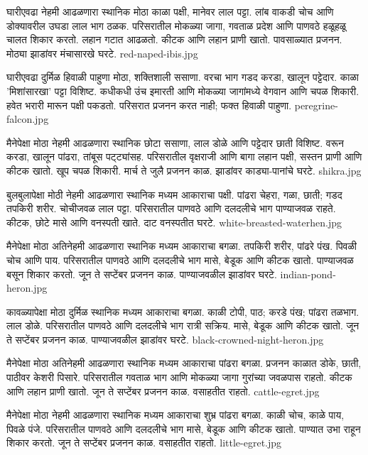 \documentclass[aspectratio=169]{beamer}
\begin{document}
{घारीएवढा}
{नेहमी आढळणारा स्थानिक}
{मोठा काळा पक्षी, मानेवर लाल पट्टा. लांब वाकडी चोच आणि डोक्यावरील उघडा लाल भाग ठळक.}
{परिसरातील मोकळ्या जागा, गवताळ प्रदेश आणि पाणवठे}
{हळूहळू चालत शिकार करतो. लहान गटात आढळतो. कीटक आणि लहान प्राणी खातो.}
{पावसाळ्यात प्रजनन. मोठ्या झाडांवर मंचासारखे घरटे.}
{red-naped-ibis.jpg}

{घारीएवढा}
{दुर्मिळ हिवाळी पाहुणा}
{मोठा, शक्तिशाली ससाणा. वरचा भाग गडद करडा, खालून पट्टेदार. काळा 'मिशांसारखा' पट्टा विशिष्ट.}
{कधीकधी उंच इमारती आणि मोकळ्या जागांमध्ये}
{वेगवान आणि चपळ शिकारी. हवेत भरारी मारून पक्षी पकडतो.}
{परिसरात प्रजनन करत नाही; फक्त हिवाळी पाहुणा.}
{peregrine-falcon.jpg}

{मैनेपेक्षा मोठा}
{नेहमी आढळणारा स्थानिक}
{छोटा ससाणा, लाल डोळे आणि पट्टेदार छाती विशिष्ट. वरून करडा, खालून पांढरा, तांबूस पट्ट्यांसह.}
{परिसरातील वृक्षराजी आणि बागा}
{लहान पक्षी, सस्तन प्राणी आणि कीटक खातो. खूप चपळ शिकारी.}
{मार्च ते जुलै प्रजनन काळ. झाडांवर काड्या-पानांचे घरटे.}
{shikra.jpg}

{बुलबुलापेक्षा मोठी}
{नेहमी आढळणारा स्थानिक}
{मध्यम आकाराचा पक्षी. पांढरा चेहरा, गळा, छाती; गडद तपकिरी शरीर. चोचीजवळ लाल पट्टा.}
{परिसरातील पाणवठे आणि दलदलीचे भाग}
{पाण्याजवळ राहते. कीटक, छोटे मासे आणि वनस्पती खाते.}
{दाट वनस्पतीत घरटे.}
{white-breasted-waterhen.jpg}

{मैनेपेक्षा मोठा}
{अतिनेहमी आढळणारा स्थानिक}
{मध्यम आकाराचा बगळा. तपकिरी शरीर, पांढरे पंख. पिवळी चोच आणि पाय.}
{परिसरातील पाणवठे आणि दलदलीचे भाग}
{मासे, बेडूक आणि कीटक खातो. पाण्याजवळ बसून शिकार करतो.}
{जून ते सप्टेंबर प्रजनन काळ. पाण्याजवळील झाडांवर घरटे.}
{indian-pond-heron.jpg}

{कावळ्यापेक्षा मोठा}
{दुर्मिळ स्थानिक}
{मध्यम आकाराचा बगळा. काळी टोपी, पाठ; करडे पंख; पांढरा तळभाग. लाल डोळे.}
{परिसरातील पाणवठे आणि दलदलीचे भाग}
{रात्री सक्रिय. मासे, बेडूक आणि कीटक खातो.}
{जून ते सप्टेंबर प्रजनन काळ. पाण्याजवळील झाडांवर घरटे.}
{black-crowned-night-heron.jpg}

{मैनेपेक्षा मोठा}
{अतिनेहमी आढळणारा स्थानिक}
{मध्यम आकाराचा पांढरा बगळा. प्रजनन काळात डोके, छाती, पाठीवर केशरी पिसारे.}
{परिसरातील गवताळ भाग आणि मोकळ्या जागा}
{गुरांच्या जवळपास राहतो. कीटक आणि लहान प्राणी खातो.}
{जून ते सप्टेंबर प्रजनन काळ. वसाहतीत राहतो.}
{cattle-egret.jpg}

{मैनेपेक्षा मोठा}
{नेहमी आढळणारा स्थानिक}
{मध्यम आकाराचा शुभ्र पांढरा बगळा. काळी चोच, काळे पाय, पिवळे पंजे.}
{परिसरातील पाणवठे आणि दलदलीचे भाग}
{मासे, बेडूक आणि कीटक खातो. पाण्यात उभा राहून शिकार करतो.}
{जून ते सप्टेंबर प्रजनन काळ. वसाहतीत राहतो.}
{little-egret.jpg}
\end{document}
